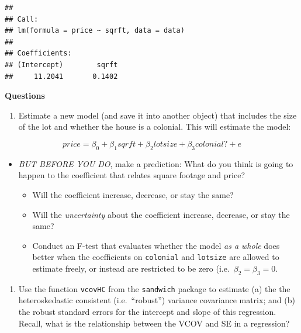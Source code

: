 \documentclass[
]{book}
\newenvironment{Shaded}{\begin{snugshade}}{\end{snugshade}}
\newcommand{\AttributeTok}[1]{\textcolor[rgb]{0.77,0.63,0.00}{#1}}
\newcommand{\DecValTok}[1]{\textcolor[rgb]{0.00,0.00,0.81}{#1}}
\newcommand{\FloatTok}[1]{\textcolor[rgb]{0.00,0.00,0.81}{#1}}
\newcommand{\FunctionTok}[1]{\textcolor[rgb]{0.00,0.00,0.00}{#1}}
\newcommand{\NormalTok}[1]{#1}
\newcommand{\OtherTok}[1]{\textcolor[rgb]{0.56,0.35,0.01}{#1}}
\newcommand{\SpecialCharTok}[1]{\textcolor[rgb]{0.00,0.00,0.00}{#1}}
\newcommand{\StringTok}[1]{\textcolor[rgb]{0.31,0.60,0.02}{#1}}
\providecommand{\tightlist}{%
  \setlength{\itemsep}{0pt}\setlength{\parskip}{0pt}}
\theoremstyle{definition}
\theoremstyle{definition}
\theoremstyle{definition}
\theoremstyle{definition}
\theoremstyle{remark}
\begin{document}
\begin{verbatim}
## 
## Call:
## lm(formula = price ~ sqrft, data = data)
## 
## Coefficients:
## (Intercept)        sqrft  
##     11.2041       0.1402
\end{verbatim}

\textbf{Questions}

\begin{enumerate}
\def\labelenumi{\arabic{enumi}.}
\tightlist
\item
  Estimate a new model (and save it into another object) that includes the size of the lot and whether the house is a colonial. This will estimate the model:
\end{enumerate}

\[ 
  price = \beta_{0} + \beta_{1} sqrft + \beta_{2} lotsize + \beta_{3} colonial? + e
\]

\begin{itemize}
\tightlist
\item
  \emph{BUT BEFORE YOU DO}, make a prediction: What do you think is going to happen to the coefficient that relates square footage and price?

  \begin{itemize}
  \tightlist
  \item
    Will the coefficient increase, decrease, or stay the same?
  \item
    Will the \emph{uncertainty} about the coefficient increase, decrease, or stay the same?
  \item
    Conduct an F-test that evaluates whether the model \emph{as a whole} does better when the coefficients on \texttt{colonial} and \texttt{lotsize} are allowed to estimate freely, or instead are restricted to be zero (i.e.~\(\beta_{2} = \beta_{3} = 0\).
  \end{itemize}
\end{itemize}

\begin{enumerate}
\def\labelenumi{\arabic{enumi}.}
\setcounter{enumi}{1}
\tightlist
\item
  Use the function \texttt{vcovHC} from the \texttt{sandwich} package to estimate (a) the the heteroskedastic consistent (i.e.~``robust'') variance covariance matrix; and (b) the robust standard errors for the intercept and slope of this regression. Recall, what is the relationship between the VCOV and SE in a regression?
\end{enumerate}

\begin{Shaded}
\end{Shaded}
\end{document}
